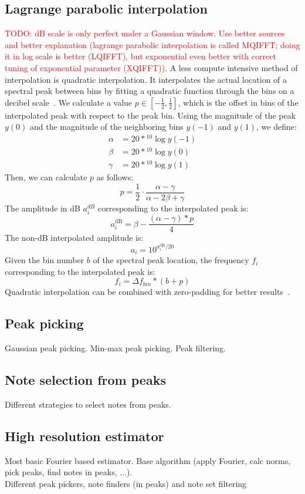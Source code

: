 \documentclass[10pt,twocolumn]{article}
\begin{document}
\subsection{Lagrange parabolic interpolation}
\textcolor{red}{TODO: dB scale is only perfect under a Gaussian window. Use better sources and better explanation (lagrange parabolic interpolation is called MQIFFT; doing it in log scale is better (LQIFFT), but exponential even better with correct tuning of exponential parameter (XQIFFT))}.
A less compute intensive method of interpolation is quadratic interpolation. It interpolates the actual location of a spectral peak between bins by fitting a quadratic function through the bins on a decibel scale~\cite{dbpolate, interpol}. We calculate a value $p \in [-\frac{1}{2}, \frac{1}{2}]$, which is the offset in bins of the interpolated peak with respect to the peak bin. Using the magnitude of the peak $y(0)$ and the magnitude of the neighboring bins $y(-1)$ and $y(1)$, we define:
\begin{align*}
    \alpha &= 20 * {}^{10}\!\log{y(-1)} \\
    \beta  &= 20 * {}^{10}\!\log{y(0)} \\
    \gamma &= 20 * {}^{10}\!\log{y(1)}
\end{align*}
Then, we can calculate $p$ as follows:
\[ p = \frac{1}{2} \cdot \frac{\alpha - \gamma}{\alpha - 2\beta + \gamma} \]
The amplitude in dB $a_i^{dB}$ corresponding to the interpolated peak is:
\[ a_i^{\text{dB}} = \beta - \frac{(\alpha - \gamma) * p}{4} \]
The non-dB interpolated amplitude is:
\[ a_i = 10^{a_i^{\text{dB}} / 20} \]
Given the bin number $b$ of the spectral peak location, the frequency $f_i$ corresponding to the interpolated peak is:
\[ f_i = \Delta f_{bin} * (b + p) \]
Quadratic interpolation can be combined with zero-padding for better results~\cite{interpolnozero}.

\subsection{Peak picking}
Gaussian peak picking. Min-max peak picking. Peak filtering.

\subsection{Note selection from peaks}
Different strategies to select notes from peaks.

\subsection{High resolution estimator}
Most basic Fourier based estimator. Base algorithm (apply Fourier, calc norms, pick peaks, find notes in peaks, ...).\\
Different peak pickers, note finders (in peaks) and note set filtering
\end{document}
